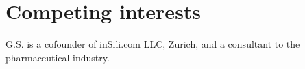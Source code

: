 \section*{Competing interests}
G.S. is a cofounder of inSili.com LLC, Zurich, and a consultant to the pharmaceutical industry.